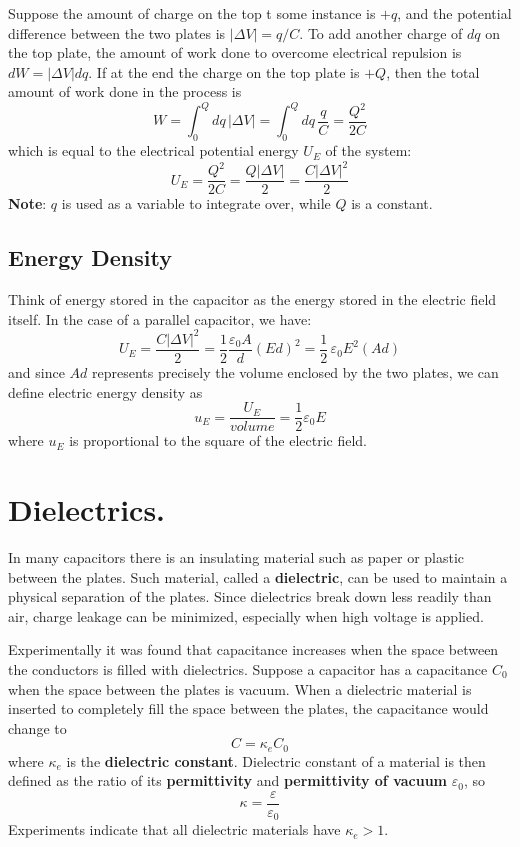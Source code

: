 \documentclass[11pt, letterpaper]{article}
\begin{document}
Suppose the amount of charge on the top t some instance is $+q$, and the potential difference between the two plates is $|\Delta V| = q/C$. To add another charge of $dq$ on the top plate, the amount of work done to overcome electrical repulsion is $dW = |\Delta V|dq$. If at the end the charge on the top plate is $+Q$, then the total amount of work done in the process is \[W = \int_0^Q dq\, |\Delta V| = \int_0^Q dq\, \frac{q}{C} = \frac{Q^2}{2C}\] which is equal to the electrical potential energy $U_E$ of the system:
\begin{equation}\label{eqn:energy}
	\boxed{U_E = \frac{Q^2}{2C} = \frac{Q|\Delta V|}{2} = \frac{C|\Delta V|^2}{2}}
\end{equation}
\textbf{Note}: $q$ is used as a variable to integrate over, while $Q$ is a constant.

\subsection{Energy Density}
Think of energy stored in the capacitor as the energy stored in the electric field itself. In the case of a parallel capacitor, we have: \[U_E = \frac{C|\Delta V|^2}{2} = \frac{1}{2}\frac{\varepsilon_0 A}{d}(Ed)^2 = \frac{1}{2}\,\varepsilon_0 E^2(Ad)\] and since $Ad$ represents precisely the volume enclosed by the two plates, we can define electric energy density as
\begin{equation}\label{eqn:energy-density}
	\boxed{u_E = \frac{U_E}{volume} = \frac{1}{2}\varepsilon_0 E}
\end{equation}
where $u_E$ is proportional to the square of the electric field. 

\section{Dielectrics.}
In many capacitors there is an insulating material such as paper or plastic between the plates. Such material, called a \textbf{dielectric}, can be used to maintain a physical separation of the plates. Since dielectrics break down less readily than air, charge leakage can be minimized, especially when high voltage is applied.

Experimentally it was found that capacitance increases when the space between the conductors is filled with dielectrics. Suppose a capacitor has a capacitance $C_0$ when the space between the plates is vacuum. When a dielectric material is inserted to completely fill the space between the plates, the capacitance would change to \[C = \kappa_e C_0\] where $\kappa_e$ is the \textbf{dielectric constant}. Dielectric constant of a material is then defined as the ratio of its \textbf{permittivity} and \textbf{permittivity of vacuum} $\varepsilon_0$, so \[\kappa = \frac{\varepsilon}{\varepsilon_0}\] Experiments indicate that all dielectric materials have $\kappa_e > 1$.
\end{document}
